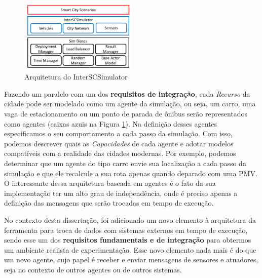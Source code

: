 \begin{figure}[ht]
	\centering
	\includegraphics[width=0.5\textwidth]{figuras/Arquitetura.pdf}
	\caption{Arquitetura do InterSCSimulator}
	\label{fig:simulator_architecture}
\end{figure}

Fazendo um paralelo com um dos \textbf{requisitos de integração}, cada \textit{Recurso} da cidade pode ser modelado como um agente da simulação, ou seja, um carro, uma vaga de estacionamento ou um ponto
de parada de ônibus serão representados como agentes (caixas azuis na Figura \ref{fig:simulator_architecture}).
Na definição desses agentes especificamos o seu comportamento a cada passo da simulação.
Com isso, podemos descrever quais as \textit{Capacidades} de cada agente e adotar modelos compatíveis com a realidade das cidades modernas.
Por exemplo, podemos determinar que um agente do tipo carro envie sua localização a cada passo da simulação e que ele recalcule a sua rota apenas quando deparado com uma PMV.
O interessante dessa arquitetura baseada em agentes é o fato da sua implementação ter um alto grau de independência, onde é preciso apenas a definição das mensagens que serão trocadas em tempo
de execução.

No contexto desta dissertação, foi adicionado um novo elemento à arquitetura da ferramenta para troca de dados com sistemas externos em tempo de execução,
sendo esse um dos \textbf{requisitos fundamentais e de integração} para obtermos um ambiente realista de experimentação.
Esse novo elemento nada mais é do que um novo agente, cujo papel é receber e enviar mensagens de sensores e atuadores, seja no contexto de outros agentes ou de outros sistemas.


